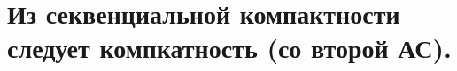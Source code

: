 \documentclass[geometry.tex]{subfiles}
\begin{document}
  \section{Из секвенциальной компактности следует компкатность (со второй АС).}
\end{document}
